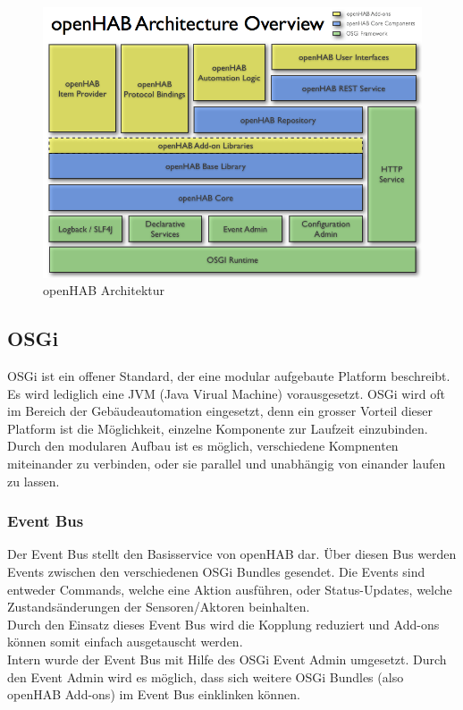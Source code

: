 \begin{figure}[H]
	\centering
		\includegraphics[scale=0.45]{report/img/openHAB_architecture}
	\caption{openHAB Architektur}
	\label{fig:ohArch}
\end{figure}

\subsection{OSGi}
OSGi ist ein offener Standard, der eine modular aufgebaute Platform beschreibt. Es wird lediglich eine JVM (Java Virual Machine) vorausgesetzt. OSGi wird oft im Bereich der Gebäudeautomation eingesetzt, denn ein grosser Vorteil dieser Platform ist die Möglichkeit, einzelne Komponente zur Laufzeit einzubinden. Durch den modularen Aufbau ist es möglich, verschiedene Kompnenten miteinander zu verbinden, oder sie parallel und unabhängig von einander laufen zu lassen.

\subsubsection{Event Bus}
Der Event Bus stellt den Basisservice von openHAB dar. Über diesen Bus werden Events zwischen den verschiedenen OSGi Bundles gesendet. Die Events sind entweder Commands, welche eine Aktion ausführen, oder Status-Updates, welche Zustandsänderungen der Sensoren/Aktoren beinhalten. \\
Durch den Einsatz dieses Event Bus wird die Kopplung reduziert und Add-ons können somit einfach ausgetauscht werden. \\
Intern wurde der Event Bus mit Hilfe des OSGi Event Admin umgesetzt. Durch den Event Admin wird es möglich, dass sich weitere OSGi Bundles (also openHAB Add-ons) im Event Bus einklinken können.

